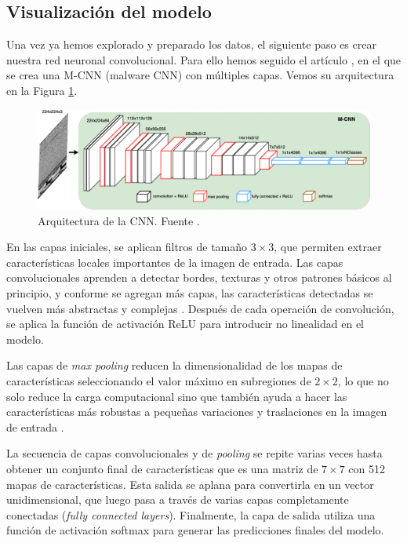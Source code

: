 \subsection{Visualización del modelo} \label{sec: visMalware}


Una vez ya hemos explorado y preparado los datos, el siguiente paso es crear nuestra red neuronal convolucional. Para ello hemos seguido el artículo \citep{kalash2018malware}, en el que se crea una M-CNN (malware CNN) con múltiples capas. Vemos su arquitectura en la Figura \ref{img: cnnMMC}.

\begin{figure}[h]
    \begin{center}
    \includegraphics[width=\textwidth]{img/cnnMMC.png}
    \end{center}
    \caption{Arquitectura de la CNN. Fuente \citep{kalash2018malware}.}
    \label{img: cnnMMC}
\end{figure}

En las capas iniciales, se aplican filtros de tamaño $3 \times 3$, que permiten extraer características locales importantes de la imagen de entrada. Las capas convolucionales aprenden a detectar bordes, texturas y otros patrones básicos al principio, y conforme se agregan más capas, las características detectadas se vuelven más abstractas y complejas \citep{geron2022hands}. Después de cada operación de convolución, se aplica la función de activación ReLU para introducir no linealidad en el modelo.

Las capas de \textit{max pooling} reducen la dimensionalidad de los mapas de características seleccionando el valor máximo en subregiones de $2 \times 2$, lo que no solo reduce la carga computacional sino que también ayuda a hacer las características más robustas a pequeñas variaciones y traslaciones en la imagen de entrada \citep{geron2022hands}.

La secuencia de capas convolucionales y de \textit{pooling} se repite varias veces hasta obtener un conjunto final de características que es una matriz de $7 \times 7$ con 512 mapas de características. Esta salida se aplana para convertirla en un vector unidimensional, que luego pasa a través de varias capas completamente conectadas (\textit{fully connected layers}). Finalmente, la capa de salida utiliza una función de activación softmax para generar las predicciones finales del modelo.

